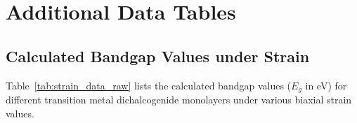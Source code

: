 
%
%

\chapter{Additional Data Tables}
\label{app:data_tables}

\section{Calculated Bandgap Values under Strain}
Table~\ref{tab:strain_data_raw} lists the calculated bandgap values ($E_g$ in \si{\electronvolt}) for different transition metal dichalcogenide monolayers under various biaxial strain values.

